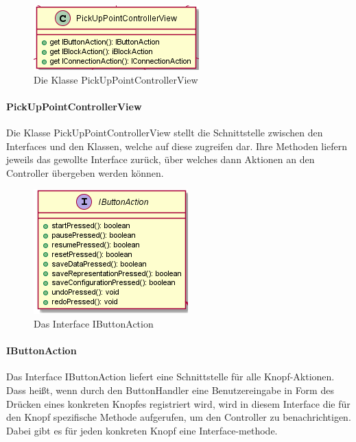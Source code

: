 \documentclass[parskip=full]{scrartcl}
\begin{document}
\begin{figure}[htbp]
	\begin{center}
		\includegraphics[width = 8 cm]{Grafiken/View/PickUpPoint.PNG}
		\caption{Die Klasse PickUpPointControllerView}
		\label{PickUpPointControllerView}
	\end{center}
\end{figure}

\paragraph{PickUpPointControllerView}

Die Klasse PickUpPointControllerView stellt die Schnittstelle zwischen den Interfaces und den Klassen, welche auf diese zugreifen dar. Ihre Methoden liefern jeweils das gewollte Interface zurück, über welches dann Aktionen an den Controller übergeben werden können.

\clearpage

\begin{figure}[htbp]
	\begin{center}
		\includegraphics[width = 7 cm]{Grafiken/View/IButtonAction.PNG}
		\caption{Das Interface IButtonAction}
		\label{Entwurf_Grob}
	\end{center}
\end{figure}

\paragraph{IButtonAction}

Das Interface IButtonAction liefert eine Schnittstelle für alle Knopf-Aktionen. Dass heißt, wenn durch den ButtonHandler eine Benutzereingabe in Form des Drücken eines konkreten Knopfes registriert wird, wird in diesem Interface die für den Knopf spezifische Methode aufgerufen, um den Controller zu benachrichtigen. Dabei gibt es für jeden konkreten Knopf eine Interface-methode.
\end{document}
